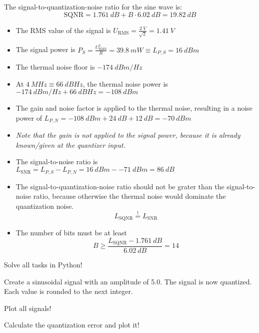 \begin{solution}
\begin{tasks}
		The signal-to-quantization-noise ratio for the sine wave is:
		\begin{equation*}
			\mathrm{SQNR} = \SI{1.761}{dB} + B \cdot \SI{6.02}{dB} = \SI{19.82}{dB}
		\end{equation*}
		
		\task
		\begin{itemize}
			\item The RMS value of the signal is $U_{\mathrm{RMS}} = \frac{\SI{2}{V}}{\sqrt{2}} = \SI{1.41}{V}$
			\item The signal power is $P_S = \frac{U_{\mathrm{RMS}}^2}{R} = \SI{39.8}{mW} \equiv L_{P,S} = \SI{16}{dBm}$
			\item The thermal noise floor is $\SI{-174}{dBm/Hz}$
			\item At $\SI{4}{MHz} \equiv \SI{66}{dBHz}$, the thermal noise power is $\SI{-174}{dBm/Hz} + \SI{66}{dBHz} = \SI{-108}{dBm}$
			\item The gain and noise factor is applied to the thermal noise, resulting in a noise power of $L_{P,N} = \SI{-108}{dBm} + \SI{24}{dB} + \SI{12}{dB} = \SI{-70}{dBm}$
			\item \textit{Note that the gain is not applied to the signal power, because it is already known/given at the quantizer input.}
			\item The signal-to-noise ratio is $L_{\mathrm{SNR}} = L_{P,S} - L_{P,N} = \SI{16}{dBm} - \SI{-71}{dBm} = \SI{86}{dB}$
			\item The signal-to-quantization-noise ratio should not be grater than the signal-to-noise ratio, because otherwise the thermal noise would dominate the quantization noise.
			\begin{equation*}
				L_{\mathrm{SQNR}} \stackrel{!}{=} L_{\mathrm{SNR}}
			\end{equation*}
			\item The number of bits must be at least
			\begin{equation*}
				B \geq \frac{L_{\mathrm{SQNR}} - \SI{1.761}{dB}}{\SI{6.02}{dB}} = 14
			\end{equation*}
		\end{itemize}
	\end{tasks}
\end{solution}

\begin{question}[subtitle={Python Programming: Quantization}]
Solve all tasks in Python!

Create a sinusoidal signal with an amplitude of 5.0. The signal is now quantized. Each value is rounded to the next integer.

Plot all signals!

Calculate the quantization error and plot it!
\end{question}

\begin{solution}
\end{solution}

%
